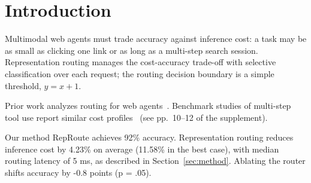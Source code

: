 \newcommand{\method}{RepRoute}

\section{Introduction}\label{sec:intro}

Multimodal web agents must trade accuracy against inference cost: a task may
be as small as clicking one link or as long as a multi-step search session.
Representation routing manages the cost-accuracy trade-off with selective
classification over each request; the routing decision boundary is a simple
threshold, $y = x + 1$.

Prior work analyzes routing for web agents~\cite{wang2025routing}.
Benchmark studies of multi-step tool use report similar cost
profiles~\cite{chen2024agents} (see pp.~10--12 of the supplement).

Our method \method{} achieves 92\% accuracy. Representation routing reduces
inference cost by 4.23\% on average (11.58\% in the best case), with median
routing latency of 5 ms, as described in Section~\ref{sec:method}. Ablating
the router shifts accuracy by -0.8 points (p = .05).
